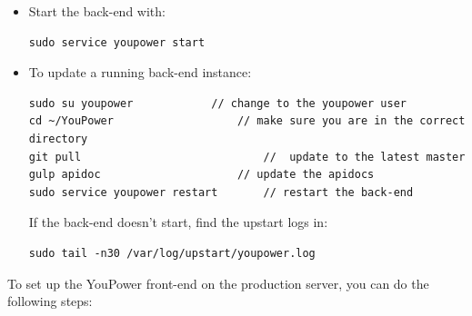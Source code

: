 \begin{itemize}
\begin{lstlisting}
# Automatically restart process after crashed
respawn

# Start the process
exec /usr/bin/nodejs /home/youpower/YouPower/backend/app.js
\end{lstlisting}

Note: YouPower has Facebook login and share features which require permissions from Facebook. 
A registered application with \textit{Facebook Developers}\footnote{\url{https://developers.facebook.com}} obtains an App ID and an App Secret from Facebook, and can request for different types of permissions to access Facebook user data.  
This process is well documented on \url{https://developers.facebook.com}. If the Facebook features are used during development on the localhost, the  App ID and an App Secret are needed by the localhost as well. 

\item Start the back-end with:
\begin{lstlisting}
sudo service youpower start
\end{lstlisting}

\item To update a running back-end instance: 
\begin{lstlisting}
sudo su youpower     		// change to the youpower user
cd ~/YouPower 					// make sure you are in the correct directory
git pull							//	update to the latest master
gulp apidoc  					// update the apidocs 
sudo service youpower restart  		// restart the back-end
\end{lstlisting}
If the back-end doesn't start, find the upstart logs in:
\begin{lstlisting}
sudo tail -n30 /var/log/upstart/youpower.log
\end{lstlisting}

\end{itemize} 

\noindent To set up the YouPower front-end on the production server, you can do the following steps: 


